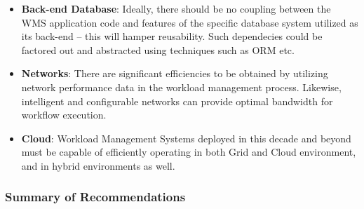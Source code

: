 \begin{itemize}
\begin{itemize}
\end{itemize}

\item \textbf{Back-end Database}: Ideally, there should be no coupling between the WMS application code and features of the specific database system
utilized as its back-end -- this will hamper reusability. Such dependecies could be factored out and abstracted using techniques such as ORM etc.

\item \textbf{Networks}: There are significant efficiencies to be obtained by utilizing network performance data in the workload management process. Likewise,
intelligent and configurable networks can provide optimal bandwidth for workflow execution.

\item \textbf{Cloud}: Workload Management Systems deployed in this decade and beyond must be capable of efficiently operating in both Grid and Cloud environment,
and in hybrid environments as well.

\end{itemize}

\subsubsection{Summary of Recommendations}
